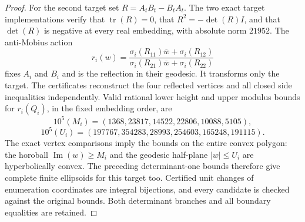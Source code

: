 \begin{proof}
For the second target set $R=A_tB_t-B_tA_t$. The two exact target
implementations verify that $\operatorname{tr}(R)=0$, that
$R^2=-\det(R)I$, and that $\det(R)$ is negative at every real
embedding, with absolute norm $21952$. The anti-Mobius action
\[
 r_i(w)=\frac{\sigma_i(R_{11})\overline w+\sigma_i(R_{12})}
                  {\sigma_i(R_{21})\overline w+\sigma_i(R_{22})}
\]
fixes $A_i$ and $B_i$ and is the reflection in their geodesic.
It transforms only the target. The certificates reconstruct the four
reflected vertices and all closed side inequalities independently.
Valid rational lower height and upper modulus bounds for $r_i(Q_i)$,
in the fixed embedding order, are
\[
 10^5(M_i)=(1368,23817,14522,22806,10088,5105),
\]
\[
 10^5(U_i)=(197767,354283,28993,254603,165248,191115).
\]
The exact vertex comparisons imply the bounds on the entire convex
polygon: the horoball $\operatorname{Im}(w)\ge M_i$ and the
geodesic half-plane $|w|\le U_i$ are hyperbolically convex.
The preceding determinant-one bounds therefore give complete finite
ellipsoids for this target too. Certified unit changes of enumeration
coordinates are integral bijections, and every candidate is checked
against the original bounds. Both determinant branches and all boundary
equalities are retained.


\end{proof}
